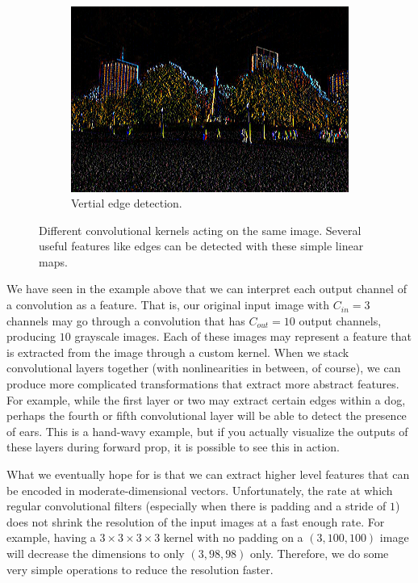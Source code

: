 \documentclass{article}
\begin{document}
\begin{example}
\begin{figure}[H]
\begin{subfigure}[b]{0.32\textwidth}
            \includegraphics[width=\textwidth]{img/03_CNN/Vertical.png}
            \caption{Vertial edge detection. }
            \label{fig:vertical_edge}
        \end{subfigure} 

        \caption{Different convolutional kernels acting on the same image. Several useful features like edges can be detected with these simple linear maps. }
        \label{fig:feature_extraction}
    \end{figure}
    \end{example}

    We have seen in the example above that we can interpret each output channel of a convolution as a feature. That is, our original input image with $C_{in} = 3$ channels may go through a convolution that has $C_{out} = 10$ output channels, producing $10$ grayscale images. Each of these images may represent a feature that is extracted from the image through a custom kernel. When we stack convolutional layers together (with nonlinearities in between, of course), we can produce more complicated transformations that extract more abstract features. For example, while the first layer or two may extract certain edges within a dog, perhaps the fourth or fifth convolutional layer will be able to detect the presence of ears. This is a hand-wavy example, but if you actually visualize the outputs of these layers during forward prop, it is possible to see this in action.  

    What we eventually hope for is that we can extract higher level features that can be encoded in moderate-dimensional vectors. Unfortunately, the rate at which regular convolutional filters (especially when there is padding and a stride of $1$) does not shrink the resolution of the input images at a fast enough rate. For example, having a $3 \times 3 \times 3 \times 3$ kernel with no padding on a $(3, 100, 100)$ image will decrease the dimensions to only $(3, 98, 98)$ only. Therefore, we do some very simple operations to reduce the resolution faster. 
\end{document}
